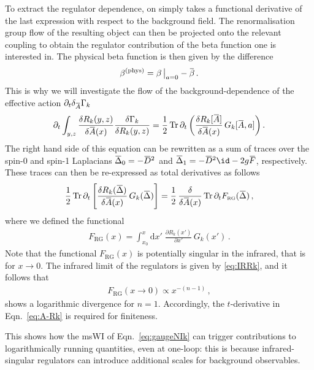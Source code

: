 \documentclass[11pt]{book}
\newcommand{\overbar}[1]{\mkern 1.5mu\overline{\mkern-1.5mu#1\mkern-1.5mu}\mkern 1.5mu}
\newcommand{\Tr}{\mathrm{Tr}}
\newcommand\FRG{ F_{\scriptscriptstyle{\mathrm{RG}}} }
\newcommand{\tr}{\mathrm{tr}}
\numberwithin{equation}{chapter}
\begin{document}
\begin{appendices}
To extract the regulator dependence, on simply takes a functional derivative of
the last expression with respect to the background field. The renormalisation group
flow of the resulting object can then be projected onto the relevant coupling
to obtain the regulator contribution
of the beta function one is interested in.
The physical beta function is then given by the difference
\begin{align}
	\beta^{(\text{phys})} = \beta \, \big|_{a=0} - \overbar \beta \,.
\end{align}
This is why we will investigate the flow of the background-dependence
of the effective action $\partial_t \delta_{\overbar A} \Gamma_k$
\begin{align}
  \partial_t \int_{y,z} \frac{\delta R_k(y,z)}{\delta \overbar A(x)}
  \frac{\delta \Gamma_k}{\delta R_k(y,z)} =
  \frac 12 \, \Tr\, \partial_t
  \left(
    \frac{\delta R_k[\overbar A]}{\delta \overbar A(x)}\, G_k[\overbar A, a]
  \right).
  \label{eq:A-Rk}
\end{align}
The right hand side of this equation can be rewritten as a sum of
traces over the spin-0 and spin-1 Laplacians $\overbar \Delta_0=
-\overbar D^2$ and $\overbar \Delta_1 =-\overbar D^2\id -2 g \overbar F$, respectively.
These traces can then be re-expressed as total derivatives as follows
\begin{align}
	\label{eq:A-Rk1}
	\frac 12 \, \Tr \, \partial_t
  \left[
    \frac{\delta R_k(\overbar \Delta)}{\delta \overbar A(x)} \, G_k(\overbar \Delta )
  \right]
  =
  \frac{1}{2} \,
	\frac{\delta }{\delta \overbar A(x)} \,
	\Tr\, \partial_t \FRG (\overbar\Delta)\,,
\end{align}
where we defined the functional
\begin{align}
	\FRG(x)= \int_{x_0}^x \mathrm dx' \;
  \frac{\partial R_k(x')}{\partial x'} \, G_k(x') \,.
  \label{eq:FA}
\end{align}
Note that the functional $\FRG(x)$ is potentially
singular in the infrared, that is for $x\rightarrow 0$.
The infrared limit of the regulators is given by
\eqref{eq:IRRk}, and it follows that
\begin{align}
	\FRG(x\to 0)
	\propto x^{-(n-1)} \,,
  \label{eq:IRF}
\end{align}
shows a logarithmic divergence for $n=1$. Accordingly, the
$t$-derivative in Eqn.~\eqref{eq:A-Rk} is required for finiteness.

This shows how the msWI of Eqn.~\eqref{eq:gaugeNIk} can trigger
contributions to logarithmically running quantities,
even at one-loop:
this is because infrared-singular regulators can
introduce additional scales for background observables.


\end{appendices}
\end{document}
